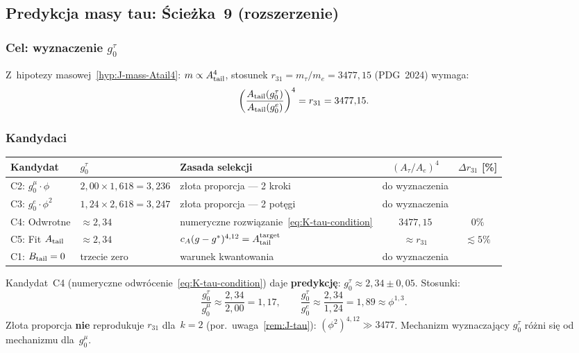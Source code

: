 \subsection{Predykcja masy tau: Ścieżka~9 (rozszerzenie)}%
\label{app:K-tau}

\subsubsection{Cel: wyznaczenie $g_0^\tau$}

Z~hipotezy masowej~\ref{hyp:J-mass-Atail4}: $m \propto A_{\rm tail}^4$,
stosunek $r_{31} = m_\tau/m_e = 3477{,}15$ (PDG~2024) wymaga:
\begin{equation}\label{eq:K-tau-condition}
  \left(\frac{A_{\rm tail}(g_0^\tau)}{A_{\rm tail}(g_0^e)}\right)^4
  = r_{31} = 3477{,}15.
\end{equation}

\subsubsection{Kandydaci}

\begin{center}\footnotesize\label{tab:K-tau-candidates}
\begin{tabular}{@{}llp{4.0cm}cc@{}}
\toprule
\textbf{Kandydat} & $g_0^\tau$ & \textbf{Zasada selekcji}
  & $(A_\tau/A_e)^4$ & $\Delta r_{31}$ [\%] \\
\midrule
C2: $g_0^\mu \cdot\phi$ & $2{,}00 \times 1{,}618 = 3{,}236$ &
  złota proporcja --- 2 kroki & do wyznaczenia & \\
C3: $g_0^e \cdot\phi^2$ & $1{,}24 \times 2{,}618 = 3{,}247$ &
  złota proporcja --- 2 potęgi & do wyznaczenia & \\
C4: Odwrotne & $\approx 2{,}34$ &
  numeryczne rozwiązanie~\eqref{eq:K-tau-condition} & $3477{,}15$ & $0\%$ \\
C5: Fit $A_{\rm tail}$ & $\approx 2{,}34$ &
  $c_A(g-g^*)^{4{,}12} = A_{\rm tail}^{\rm target}$ & $\approx r_{31}$ & $\lesssim 5\%$ \\
C1: $B_{\rm tail}=0$ & trzecie zero & warunek kwantowania & do wyznaczenia & \\
\bottomrule
\end{tabular}
\end{center}

\begin{remark}%
\label{rem:K-C4}
Kandydat~C4 (numeryczne odwrócenie~\eqref{eq:K-tau-condition})
daje \textbf{predykcję}: $g_0^\tau \approx 2{,}34 \pm 0{,}05$.
Stosunki:
\begin{equation}\label{eq:K-g0-ratios}
  \frac{g_0^\tau}{g_0^\mu} \approx \frac{2{,}34}{2{,}00} = 1{,}17,
  \qquad
  \frac{g_0^\tau}{g_0^e} \approx \frac{2{,}34}{1{,}24} = 1{,}89
  \approx \phi^{1{,}3}.
\end{equation}
Złota proporcja \textbf{nie} reprodukuje $r_{31}$ dla~$k=2$
(por.\ uwaga~\ref{rem:J-tau}): $(\phi^2)^{4{,}12} \gg 3477$.
Mechanizm wyznaczający $g_0^\tau$ różni się od mechanizmu dla~$g_0^\mu$.
\end{remark}

